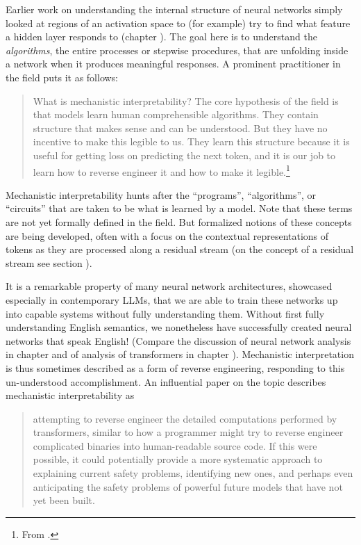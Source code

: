Earlier work on understanding the internal structure of neural networks simply looked at regions of an
activation space to (for example) try to find what feature a hidden layer responds to (chapter ). The goal
here is to understand the \emph{algorithms}, the entire processes or
stepwise procedures, that are unfolding inside a network when it produces
meaningful responses. A prominent practitioner in the field puts it as follows:

\begin{quote}
What is mechanistic interpretability? The core hypothesis of the field is that
models learn human comprehensible algorithms. They contain structure that makes
sense and can be understood. But they have no incentive to make this legible to
us. They learn this structure because it is useful for getting loss on
predicting the next token, and it is our job to learn how to reverse engineer
it and how to make it legible.\footnote{From
.}
\end{quote}
Mechanistic interpretability hunts after the ``programs'', ``algorithms'', or ``circuits''
that are taken to be what is learned by a model. Note that these terms are not yet formally
defined in the field. But formalized notions of these concepts are being
developed, often with a focus on the contextual representations of tokens as they are processed
along a residual stream (on the concept of a residual stream see section
).

It is a remarkable property of many neural network architectures, showcased
especially in contemporary LLMs, that we are able to train these networks up
into capable systems without fully understanding them. Without first fully
understanding English semantics, we nonetheless have successfully created
neural networks that speak English! (Compare the discussion of neural network
analysis in chapter  and of analysis of transformers in
chapter ). Mechanistic interpretation is thus sometimes
described as a form of reverse engineering, responding to this un-understood
accomplishment. An influential paper on the topic describes mechanistic
interpretability as

\begin{quote}
attempting to reverse engineer the detailed computations performed by
transformers, similar to how a programmer might try to reverse engineer
complicated binaries into human-readable source code.  If this were possible,
it could potentially provide a more systematic approach to explaining current
safety problems, identifying new ones, and perhaps even anticipating the safety
problems of powerful future models that have not yet been
built.\cite{elhage2021mathematical} 
\end{quote}

